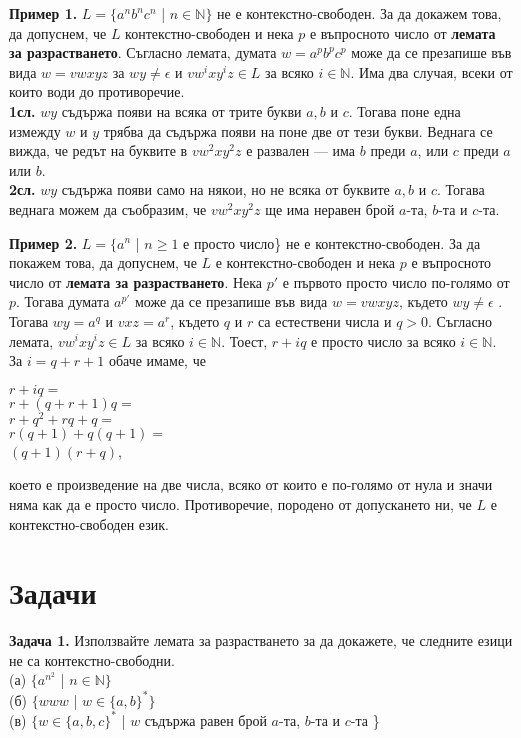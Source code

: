 \documentclass{article}
\begin{document}
\vspace{15pt}

\textbf{Пример 1.} $L = \{a^nb^nc^n$ | $n \in \mathbb{N}\}$ не е контекстно-свободен. За да докажем
това, да допуснем, че $L$ контекстно-свободен и нека $p$ е въпросното число от 
\textbf{лемата за разрастването}. Съгласно лемата, думата $w = a^pb^pc^p$ може да се 
презапише във вида $w = vwxyz$ за $wy \neq \epsilon$ и $vw^ixy^iz \in L$ за всяко
$i \in \mathbb{N}$. Има два случая, всеки от които води до противоречие. \\
\textbf{1сл.} $wy$ съдържа появи на всяка от трите букви $a,b$ и $c$. Тогава поне една
измежду $w$ и $y$ трябва да съдържа появи на поне две от тези букви. Веднага се вижда, че 
редът на буквите в $vw^2xy^2z$ е развален — има $b$ преди $a$, или $c$ преди $a$ или $b$. \\
\textbf{2сл.} $wy$ съдържа появи само на някои, но не всяка от буквите $a,b$ и $c$. 
Тогава веднага можем да съобразим, че $vw^2xy^2z$ ще има неравен брой $a$-та, $b$-та и
$c$-та.


\vspace{15pt}

\textbf{Пример 2.} $L = \{a^n$ | $n \geq 1$ е просто число\} не е контекстно-свободен.
За да покажем това, да допуснем, че $L$ е контекстно-свободен и нека $p$ е въпросното
число от \textbf{лемата за разрастването}. Нека $p'$ е първото просто число по-голямо
от $p$. Тогава думата $a^{p'}$ може да се презапише във вида $w = vwxyz$, където $wy \neq \epsilon$
. Тогава $wy = a^q$ и $vxz = a^r$, където $q$ и $r$ са естествени числа и $q > 0$. Съгласно
лемата, $vw^ixy^iz \in L$ за всяко $i \in \mathbb{N}$. Тоест, $r + iq$ е просто число
за всяко $i \in \mathbb{N}$. За $i = q+r+1$ обаче имаме, че \\
\begin{center}
$r + iq = $ \\
$r + (q+r+1)q = $ \\
$r + q^2 + rq + q = $ \\
$r(q+1) + q(q+1) = $ \\
$(q+1)(r+q)$, \\
\end{center}
което е произведение на две числа, всяко от които е по-голямо от нула и значи няма как
да е просто число. Противоречие, породено от допускането ни, че $L$ е контекстно-свободен 
език.
\vspace{25pt}

\section{Задачи} 
\textbf{Задача 1.} Използвайте лемата за разрастването за да докажете, че следните езици
не са контекстно-свободни. \\
(а) $\{a^{n^2}$ | $n \in \mathbb{N}\}$ \\
(б) $\{www$ | $w \in \{a,b\}^*\}$ \\
(в) $\{w \in \{a,b,c\}^*$ | $w$ съдържа равен брой $a$-та, $b$-та и $c$-та \} \\
\end{document}

